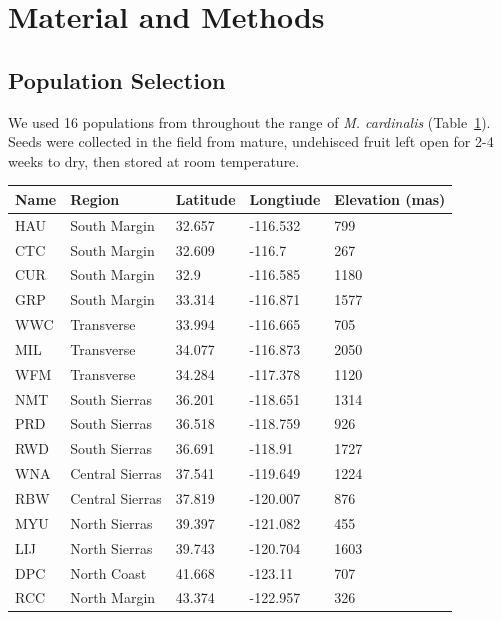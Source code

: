 \documentclass[11pt, oneside]{article}
\begin{document}
\section*{Material and Methods}

\subsection*{Population Selection}

We used 16 populations from throughout the range of \textit{M. cardinalis} (Table~\ref{table:Table_FocalPops}). Seeds were collected in the field from mature, undehisced fruit left open for 2-4 weeks to dry, then stored at room temperature.



\begin{table}[ht]
   \centering
   \begin{tabular}{@{} lllll @{}}
      \toprule
  Name& Region  & Latitude  & Longtiude  & Elevation (mas) \\
      \midrule
	HAU & South Margin & 32.657	& 
    -116.532	& 799   \\
	CTC	& South Margin & 32.609 & 
    -116.7	& 267   \\
	CUR	& South Margin & 32.9 & 
    -116.585	& 1180   \\
	GRP & South Margin & 33.314 &
    -116.871	& 1577   \\
	WWC &	Transverse & 33.994 & 
    -116.665	& 705   \\
	MIL	& Transverse & 34.077 & 
    -116.873	& 2050   \\
	WFM	& Transverse & 34.284 & 
    -117.378	& 1120   \\
	NMT	& South Sierras & 36.201 & 
    -118.651	& 1314   \\
	PRD	& South Sierras & 36.518 & 
    -118.759	& 926   \\
	RWD	& South Sierras & 36.691 & 
    -118.91	& 1727   \\
	WNA	& Central Sierras & 37.541 & 
    -119.649	& 1224   \\
	RBW	& Central Sierras	& 37.819 & 
    -120.007	& 876   \\
	MYU	& North Sierras	& 39.397 & 
    -121.082	& 455   \\
	LIJ	& North Sierras	& 39.743 & 
    -120.704	& 1603   \\
	DPC	& North Coast & 41.668 & 
    -123.11	& 707   \\
	RCC	& North Margin & 43.374 & 
    -122.957	& 326   \\
	\bottomrule
	\end{tabular}
	\label{table:Table_FocalPops}
\end{table}
\end{document}
